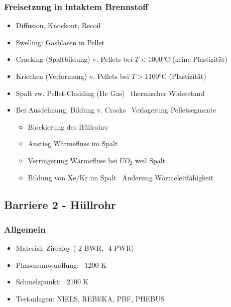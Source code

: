 \documentclass[12pt]{article}
\begin{document}
\subsubsection{Freisetzung in intaktem Brennstoff}
\begin{itemize}[noitemsep]
	\item Diffusion, Knockout, Recoil
	\item Swelling: Gasblasen in Pellet
	\item Cracking (Spaltbildung) v. Pellets bei \(T < 1000\)°C (keine Plastizität)
	\item Kriechen (Verformung) v. Pellets bei \(T > 1100\)°C (Plastizität)
	\item Spalt zw. Pellet-Cladding (He Gas) \textrightarrow\ thermischer Widerstand
	\item Bei Ausdehnung: Bildung v. Cracks \textrightarrow\ Verlagerung Pelletsegmente
		\begin{itemize}[noitemsep]
			\item Blockierung des Hüllrohrs
			\item Anstieg Wärmefluss im Spalt
			\item Verringerung Wärmefluss bei \(UO_2\) weil Spalt
			\item Bildung von Xe/Kr im Spalt \textrightarrow\ Änderung Wärmeleitfähigkeit
		\end{itemize}
\end{itemize}

\subsection{Barriere 2 - Hüllrohr}

\subsubsection{Allgemein}
\begin{itemize}[noitemsep]
	\item Material: Zircaloy (-2 BWR, -4 PWR)
	\item Phasenumwandlung: ~1200 K
	\item Schmelzpunkt: ~2100 K
	\item Testanlagen: NIELS, REBEKA, PBF, PHEBUS
\end{itemize}
\end{document}
